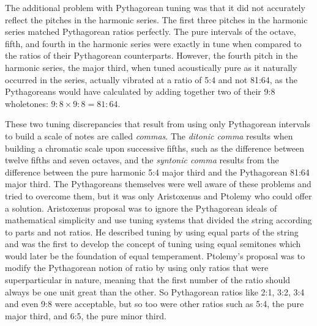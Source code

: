 The additional problem with Pythagorean tuning was that it did not accurately reflect the pitches in the harmonic
series. The first three pitches in the harmonic series matched Pythagorean ratios perfectly. The pure intervals of the
octave, fifth, and fourth in the harmonic series were exactly in tune when compared to the ratios of their Pythagorean
counterparts. However, the fourth pitch in the harmonic series, the major third, when tuned acoustically pure as it
naturally occurred in the series, actually vibrated at a ratio of 5:4 and not 81:64, as the Pythagoreans would have
calculated by adding together two of their 9:8 wholetones: $ 9:8 \times 9:8 = 81:64 $.

These two tuning discrepancies that result from using only Pythagorean intervals to build a scale of notes are called
\textit{commas}. The \textit{ditonic comma} results when building a chromatic scale upon successive fifths, such as the
difference between twelve fifths and seven octaves, and the \textit{syntonic comma} results from the difference between
the pure harmonic 5:4 major third and the Pythagorean 81:64 major third. The Pythagoreans themselves were well aware of
these problems and tried to overcome them, but it was only Aristoxenus and Ptolemy who could offer a solution.
Aristoxenus proposal was to ignore the Pythagorean ideals of mathematical simplicity and use tuning systems that divided
the string according to parts and not ratios. He described tuning by using equal parts of the string and was the first
to develop the concept of tuning using equal semitones which would later be the foundation of equal temperament.
Ptolemy's proposal was to modify the Pythagorean notion of ratio by using only ratios that were superparticular in
nature, meaning that the first number of the ratio should always be one unit great than the other. So Pythagorean
ratios like 2:1, 3:2, 3:4 and even 9:8 were acceptable, but so too were other ratios such as 5:4, the pure major third,
and 6:5, the pure minor third.

